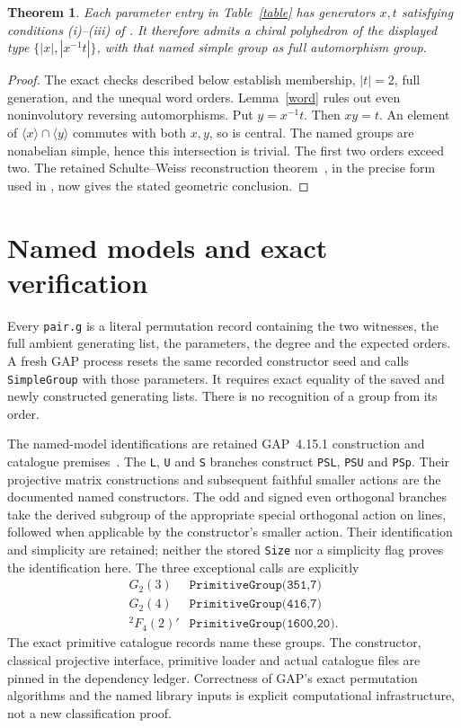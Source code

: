 \documentclass[10pt,a4paper]{article}
\newtheorem{theorem}{Theorem}
\begin{document}
\begin{theorem}\label{main}
Each parameter entry in Table~\ref{table} has generators $x,t$ satisfying
conditions (i)--(iii) of \cite[Theorem~1.1]{LL}. It therefore admits a
chiral polyhedron of the displayed type $\{|x|,|x^{-1}t|\}$, with that
named simple group as full automorphism group.
\end{theorem}
\begin{proof}
The exact checks described below establish membership, $|t|=2$, full
generation, and the unequal word orders. Lemma~\ref{word} rules out even
noninvolutory reversing automorphisms. Put $y=x^{-1}t$. Then $xy=t$.
An element of $\langle x\rangle\cap\langle y\rangle$ commutes with both
$x,y$, so is central. The named groups are nonabelian simple, hence this
intersection is trivial. The first two orders exceed two. The retained
Schulte--Weiss reconstruction theorem~\cite{SW}, in the precise form used
in \cite[Section~1]{LL}, now gives the stated geometric conclusion.
\end{proof}
\newpage
\section{Named models and exact verification}
Every \texttt{pair.g} is a literal permutation record containing the two
witnesses, the full ambient generating list, the parameters, the degree
and the expected orders. A fresh GAP process resets the same recorded
constructor seed and calls \texttt{SimpleGroup} with those parameters.
It requires exact equality of the saved and newly constructed generating
lists. There is no recognition of a group from its order.

The named-model identifications are retained GAP~4.15.1 construction and
catalogue premises~\cite{GAP}. The \texttt{L}, \texttt{U} and \texttt{S}
branches construct \texttt{PSL}, \texttt{PSU} and \texttt{PSp}. Their
projective matrix constructions and subsequent faithful smaller actions
are the documented named constructors. The odd and signed even
orthogonal branches take the derived subgroup of the appropriate
special orthogonal action on lines, followed when applicable by the
constructor's smaller action. Their identification and simplicity are
retained; neither the stored \texttt{Size} nor a simplicity flag proves
the identification here. The three exceptional calls are explicitly
\[
\begin{array}{c|c}
G_2(3)&\texttt{PrimitiveGroup(351,7)}\\
G_2(4)&\texttt{PrimitiveGroup(416,7)}\\
{}^2F_4(2)'&\texttt{PrimitiveGroup(1600,20)}.
\end{array}
\]
The exact primitive catalogue records name these groups. The constructor,
classical projective interface, primitive loader and actual catalogue
files are pinned in the dependency ledger. Correctness of GAP's exact
permutation algorithms and the named library inputs is explicit
computational infrastructure, not a new classification proof.
\end{document}
